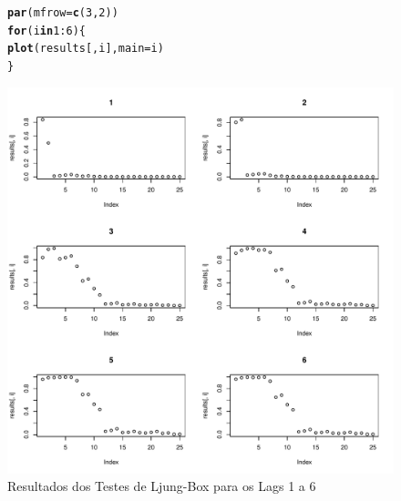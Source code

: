 \documentclass{article}\usepackage[]{graphicx}\usepackage[]{color}
\makeatletter
\def\maxwidth{ %
  \ifdim\Gin@nat@width>\linewidth
    \linewidth
  \else
    \Gin@nat@width
  \fi
}
\newcommand{\hlnum}[1]{\textcolor[rgb]{0.686,0.059,0.569}{#1}}%
\newcommand{\hlopt}[1]{\textcolor[rgb]{0,0,0}{#1}}%
\newcommand{\hlstd}[1]{\textcolor[rgb]{0.345,0.345,0.345}{#1}}%
\newcommand{\hlkwa}[1]{\textcolor[rgb]{0.161,0.373,0.58}{\textbf{#1}}}%
\newcommand{\hlkwc}[1]{\textcolor[rgb]{0.333,0.667,0.333}{#1}}%
\newcommand{\hlkwd}[1]{\textcolor[rgb]{0.737,0.353,0.396}{\textbf{#1}}}%
\newenvironment{kframe}{%
 \def\at@end@of@kframe{}%
 \ifinner\ifhmode%
  \def\at@end@of@kframe{\end{minipage}}%
  \begin{minipage}{\columnwidth}%
 \fi\fi%
 \def\FrameCommand##1{\hskip\@totalleftmargin \hskip-\fboxsep
 \colorbox{shadecolor}{##1}\hskip-\fboxsep
     \hskip-\linewidth \hskip-\@totalleftmargin \hskip\columnwidth}%
 \MakeFramed {\advance\hsize-\width
   \@totalleftmargin\z@ \linewidth\hsize
   \@setminipage}}%
 {\par\unskip\endMakeFramed%
 \at@end@of@kframe}
\newenvironment{knitrout}{}{} %
\makeatother
\begin{document}
            \begin{figure}[H]
            \caption{Resultados dos Testes de Ljung-Box para os Lags 1 a 6}
            \centering
\begin{knitrout}
\color{fgcolor}\begin{kframe}
\begin{alltt}
\hlkwd{par}\hlstd{(}\hlkwc{mfrow} \hlstd{=} \hlkwd{c}\hlstd{(}\hlnum{3}\hlstd{,}\hlnum{2}\hlstd{))}
\hlkwa{for} \hlstd{(i} \hlkwa{in} \hlnum{1}\hlopt{:}\hlnum{6}\hlstd{)\{}
  \hlkwd{plot}\hlstd{(results[,i],} \hlkwc{main}\hlstd{=i)}
\hlstd{\}}
\end{alltt}
\end{kframe}
\includegraphics[width=\maxwidth]{figure/unnamed-chunk-79-1} 

\end{knitrout}
            \end{figure}
            
\end{document}
